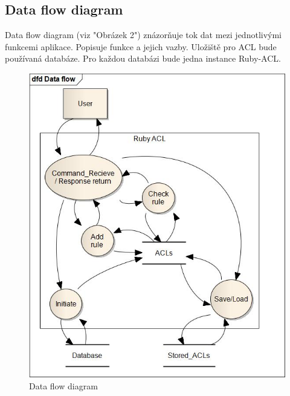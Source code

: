\documentclass[11pt,twoside,a4paper]{book}
\begin{document}
\subsection{Data flow diagram}
Data flow diagram (viz "Obrázek 2") znázorňuje tok dat mezi jednotlivými funkcemi aplikace. Popisuje funkce a jejich vazby. Uložiště pro ACL bude používaná databáze. Pro každou databázi bude jedna instance Ruby-ACL.
\begin{figure}
\includegraphics[width=15cm]{DataFlowBigFont.jpg}
\caption{Data flow diagram}
\label{fig:Data flow diagram}
\end{figure}

\end{document}
